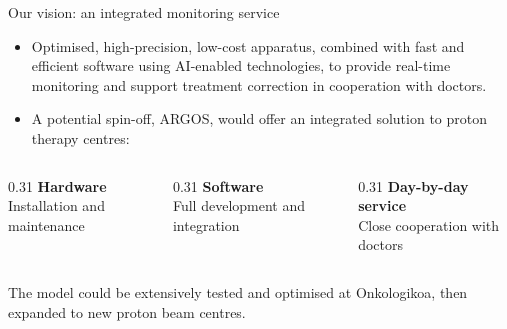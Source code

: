 \documentclass[aspectratio=169,11pt]{beamer}
\newcommand{\hi}[1]{\textcolor{crRed}{#1}}
\begin{document}
\begin{frame}{Our vision: an integrated monitoring service}
\small
\begin{itemize}
\item Optimised, \hi{high-precision, low-cost apparatus}, combined with fast and efficient software using \hi{AI-enabled technologies}, to provide real-time monitoring and support treatment correction in cooperation with doctors.
\item A potential spin-off, \hi{ARGOS}, would offer an integrated solution to proton therapy centres:
\end{itemize}
\par\vspace{2mm}
\begin{columns}[T,onlytextwidth]
\begin{column}{0.31\textwidth}
\centering\textbf{Hardware}\\[2mm]
Installation and maintenance
\end{column}
\begin{column}{0.31\textwidth}
\centering\textbf{Software}\\[2mm]
Full development and integration
\end{column}
\begin{column}{0.31\textwidth}
\centering\textbf{Day-by-day service}\\[2mm]
Close cooperation with doctors
\end{column}
\end{columns}
\par\vspace{5mm}
The model could be extensively tested and optimised at \hi{Onkologikoa}, then expanded to new proton beam centres.
\end{frame}
\end{document}
